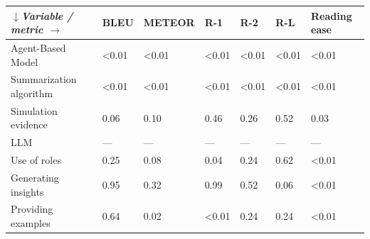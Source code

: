 \begin{tabular}{|l|l|l|l|l|l|l|}
\hline
\textit{$\downarrow$Variable / metric $\rightarrow$} & BLEU & METEOR & R-1 & R-2 & R-L & Reading ease \\
 \hline
 Agent-Based Model & \textless{}0.01 & \textless{}0.01 & \textless{}0.01 & \textless{}0.01 & \textless{}0.01 & \textless{}0.01 \\
 \hline
 Summarization algorithm & \textless{}0.01 & \textless{}0.01 & \textless{}0.01 & \textless{}0.01 & \textless{}0.01 & \textless{}0.01 \\
 \hline
 Simulation evidence & 0.06 & 0.10 & 0.46 & 0.26 & 0.52 & 0.03 \\
 \hline
 LLM & — & — & — & — & — & — \\
 \hline
 Use of roles & 0.25 & 0.08 & 0.04 & 0.24 & 0.62 & \textless{}0.01 \\
 \hline
 Generating insights & 0.95 & 0.32 & 0.99 & 0.52 & 0.06 & \textless{}0.01 \\
 \hline
 Providing examples & 0.64 & 0.02 & \textless{}0.01 & 0.24 & 0.24 & \textless{}0.01 \\
\hline
\end{tabular}
